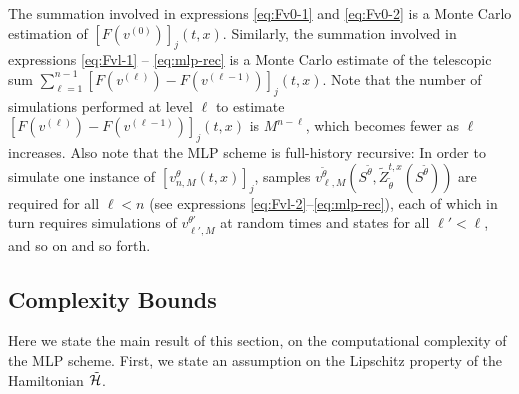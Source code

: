 \documentclass[11pt]{article}
\theoremstyle{definition}
\theoremstyle{plain}
\newcommand{\R}{\mathbb{R}}
\newcommand{\cH}{{\cal H}}
\begin{document}
The summation involved in expressions \eqref{eq:Fv0-1} and \eqref{eq:Fv0-2} is a Monte Carlo estimation 
of $\left[F\left(v^{(0)}\right)\right]_j(t,x)$. Similarly, the summation involved in expressions \eqref{eq:Fvl-1} -- \eqref{eq:mlp-rec} 
is a Monte Carlo estimate of the telescopic sum $\sum_{\ell=1}^{n-1} \left[F\left(v^{(\ell)}\right)-F\left(v^{(\ell-1)}\right)\right]_j(t, x)$. 
Note that the number of simulations performed at level $\ell$ to estimate $\left[F\left(v^{(\ell)}\right)-F\left(v^{(\ell-1)}\right)\right]_j(t, x)$ is $M^{n-\ell}$, 
which becomes fewer as $\ell$ increases. 
Also note that the MLP scheme is full-history recursive: In order to simulate one instance of $\left[v^\theta_{n,M}(t,x)\right]_j$, 
samples $v^{\tilde{\theta}}_{\ell, M}\left(S^{\tilde{\theta}}, \tilde{Z}^{t,x}_{\tilde{\theta}}\left(S^{\tilde{\theta}}\right)\right)$ are required for all $\ell < n$ 
(see expressions \eqref{eq:Fvl-2}--\eqref{eq:mlp-rec}), 
each of which in turn requires simulations of $v^{\theta'}_{\ell', M}$ at random times and states for all $\ell' < \ell$, and so on and so forth. 

\subsection{Complexity Bounds}

Here we state the main result of this section, 
on the computational complexity of the MLP scheme. 
First, we state an assumption on the Lipschitz property of the Hamiltonian $\tilde \cH$. 
\end{document}

